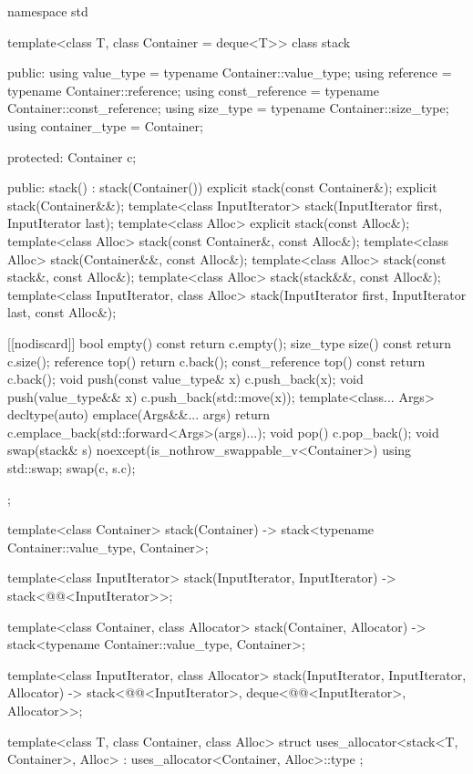 \begin{codeblock}
namespace std {
  template<class T, class Container = deque<T>>
  class stack {
  public:
    using value_type      = typename Container::value_type;
    using reference       = typename Container::reference;
    using const_reference = typename Container::const_reference;
    using size_type       = typename Container::size_type;
    using container_type  = Container;

  protected:
    Container c;

  public:
    stack() : stack(Container()) {}
    explicit stack(const Container&);
    explicit stack(Container&&);
    template<class InputIterator> stack(InputIterator first, InputIterator last);
    template<class Alloc> explicit stack(const Alloc&);
    template<class Alloc> stack(const Container&, const Alloc&);
    template<class Alloc> stack(Container&&, const Alloc&);
    template<class Alloc> stack(const stack&, const Alloc&);
    template<class Alloc> stack(stack&&, const Alloc&);
    template<class InputIterator, class Alloc>
      stack(InputIterator first, InputIterator last, const Alloc&);

    [[nodiscard]] bool empty() const    { return c.empty(); }
    size_type size()  const             { return c.size(); }
    reference         top()             { return c.back(); }
    const_reference   top() const       { return c.back(); }
    void push(const value_type& x)      { c.push_back(x); }
    void push(value_type&& x)           { c.push_back(std::move(x)); }
    template<class... Args>
      decltype(auto) emplace(Args&&... args)
        { return c.emplace_back(std::forward<Args>(args)...); }
    void pop()                          { c.pop_back(); }
    void swap(stack& s) noexcept(is_nothrow_swappable_v<Container>)
      { using std::swap; swap(c, s.c); }
  };

  template<class Container>
    stack(Container) -> stack<typename Container::value_type, Container>;

  template<class InputIterator>
    stack(InputIterator, InputIterator) -> stack<@@<InputIterator>>;

  template<class Container, class Allocator>
    stack(Container, Allocator) -> stack<typename Container::value_type, Container>;

  template<class InputIterator, class Allocator>
    stack(InputIterator, InputIterator, Allocator)
      -> stack<@@<InputIterator>, deque<@@<InputIterator>,
               Allocator>>;

  template<class T, class Container, class Alloc>
    struct uses_allocator<stack<T, Container>, Alloc>
      : uses_allocator<Container, Alloc>::type { };
}
\end{codeblock}

